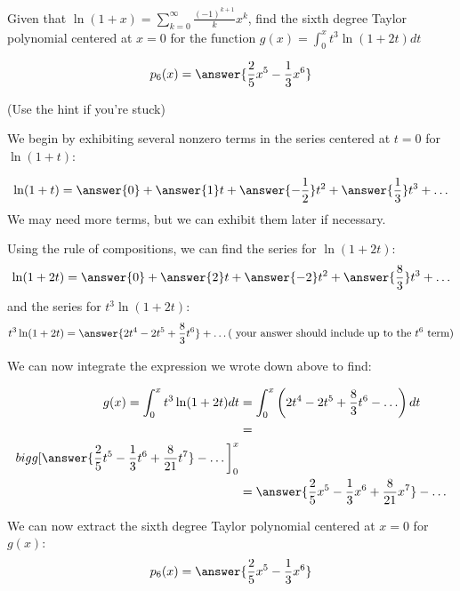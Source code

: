 \documentclass{ximera}
\author{Jim Talamo}
\begin{document}
\begin{exercise}
Given that $\ln(1+x) =\sum_{k=0}^{\infty} \frac{(-1)^{k+1}}{k} x^k$, find the sixth degree Taylor polynomial centered at $x=0$ for the function $g(x) = \int_0^x t^3 \ln(1+2t) dt$

\[
p_6(x) = \answer{\frac{2}{5}x^5-\frac{1}{3}x^6}
\]

(Use the hint if you're stuck)
\begin{hint}
We begin by exhibiting several nonzero terms in the series centered at $t=0$ for  $\ln(1+t)$:

\[
\ln(1+t) = \answer{0}+\answer{1}t+\answer{-\frac{1}{2}}t^2+\answer{\frac{1}{3}}t^3+\ldots
\]
We may need more terms, but we can exhibit them later if necessary.

\begin{question}
Using the rule of compositions, we can find the series for $\ln(1+2t)$:
\[
\ln(1+2t) = \answer{0}+\answer{2}t+\answer{-2}t^2+\answer{\frac{8}{3}}t^3+\ldots
\]
and the series for $t^3\ln(1+2t)$:
\[
t^3\ln(1+2t) = \answer{2t^4-2t^5+\frac{8}{3}t^6}+\ldots (\textrm{ your answer should include up to the } t^6 \textrm{ term})
\]

\begin{question}
We can now integrate the expression we wrote down above to find:

\begin{align*}
g(x) = \int_0^x t^3 \ln(1+2t) dt &= \int_0^x \left(2t^4-2t^5+\frac{8}{3}t^6-\ldots\right) dt \\
&= \\bigg[\answer{\frac{2}{5}t^5-\frac{1}{3}t^6+\frac{8}{21}t^7} - \ldots \bigg]_0^x \\
&= \answer{\frac{2}{5}x^5-\frac{1}{3}x^6+\frac{8}{21}x^7} - \ldots 
\end{align*}

We can now extract the sixth degree Taylor polynomial centered at $x=0$ for $g(x)$:
\[
p_6(x) = \answer{\frac{2}{5}x^5-\frac{1}{3}x^6}
\]

\end{question}
\end{question}
\end{hint}

\end{exercise}
\end{document}
